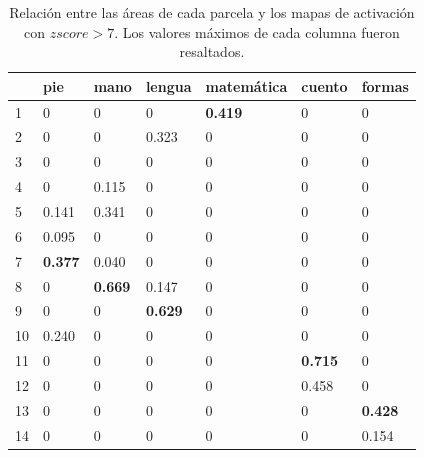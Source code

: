 \begin{table}[]
\centering

\begin{tabular}{|l|l|l|l|l|l|l|}
\hline
   & pie   & mano  & lengua & matem\'atica & cuento & formas \\ \hline
1  & 0     & 0     & 0      & {\bf 0.419} & 0     & 0      \\ \hline
2  & 0     & 0     & 0.323  & 0          & 0      & 0      \\ \hline
3  & 0     & 0     & 0      & 0          & 0      & 0      \\ \hline
4  & 0     & 0.115 & 0      & 0          & 0      & 0      \\ \hline
5  & 0.141 & 0.341 & 0      & 0          & 0      & 0      \\ \hline
6  & 0.095 & 0     & 0      & 0          & 0      & 0      \\ \hline
7  & {\bf 0.377} & 0.040 & 0      & 0          & 0      & 0      \\ \hline
8  & 0     & {\bf 0.669} & 0.147  & 0          & 0      & 0      \\ \hline
9  & 0     & 0     & {\bf 0.629}  & 0          & 0      & 0      \\ \hline
10 & 0.240 & 0     & 0      & 0          & 0      & 0      \\ \hline
11 & 0     & 0     & 0      & 0          & {\bf 0.715}  & 0      \\ \hline
12 & 0     & 0     & 0      & 0          & 0.458  & 0      \\ \hline
13 & 0     & 0     & 0      & 0          & 0      & {\bf 0.428}  \\ \hline
14 & 0     & 0     & 0      & 0          & 0      & 0.154 \\ \hline
\end{tabular}
\caption{Relaci\'on entre las \'areas de cada parcela y los mapas de
         activaci\'on con $zscore > 7$. Los valores m\'aximos de cada 
         columna fueron resaltados.}
\label{tb:zscore7}         
\end{table}

